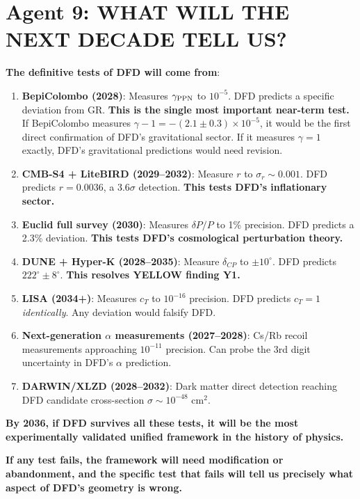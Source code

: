 \documentclass[11pt,a4paper]{article}
\begin{document}
\section{Agent 9: WHAT WILL THE NEXT DECADE TELL US?}

\begin{tcolorbox}[colback=blue!5!white, colframe=dfdblue, title=\textbf{THE NEXT DECADE OF EXPERIMENTAL TESTS}]

\textbf{The definitive tests of DFD will come from}:

\begin{enumerate}
\item \textbf{BepiColombo (2028)}: Measures $\gamma_{\rm PPN}$ to $10^{-5}$. DFD predicts a specific deviation from GR. \textbf{This is the single most important near-term test.} If BepiColombo measures $\gamma - 1 = -(2.1 \pm 0.3) \times 10^{-5}$, it would be the first direct confirmation of DFD's gravitational sector. If it measures $\gamma = 1$ exactly, DFD's gravitational predictions would need revision.

\item \textbf{CMB-S4 + LiteBIRD (2029--2032)}: Measure $r$ to $\sigma_r \sim 0.001$. DFD predicts $r = 0.0036$, a $3.6\sigma$ detection. \textbf{This tests DFD's inflationary sector.}

\item \textbf{Euclid full survey (2030)}: Measures $\delta P/P$ to 1\% precision. DFD predicts a 2.3\% deviation. \textbf{This tests DFD's cosmological perturbation theory.}

\item \textbf{DUNE + Hyper-K (2028--2035)}: Measure $\delta_{CP}$ to $\pm 10^\circ$. DFD predicts $222^\circ \pm 8^\circ$. \textbf{This resolves YELLOW finding Y1.}

\item \textbf{LISA (2034+)}: Measures $c_T$ to $10^{-16}$ precision. DFD predicts $c_T = 1$ \textit{identically}. Any deviation would falsify DFD.

\item \textbf{Next-generation $\alpha$ measurements (2027--2028)}: Cs/Rb recoil measurements approaching $10^{-11}$ precision. Can probe the 3rd digit uncertainty in DFD's $\alpha$ prediction.

\item \textbf{DARWIN/XLZD (2028--2032)}: Dark matter direct detection reaching DFD candidate cross-section $\sigma \sim 10^{-48}$ cm$^2$.
\end{enumerate}

\textbf{By 2036, if DFD survives all these tests, it will be the most experimentally validated unified framework in the history of physics.}

\textbf{If any test fails, the framework will need modification or abandonment, and the specific test that fails will tell us precisely what aspect of DFD's geometry is wrong.}
\end{tcolorbox}
\end{document}

